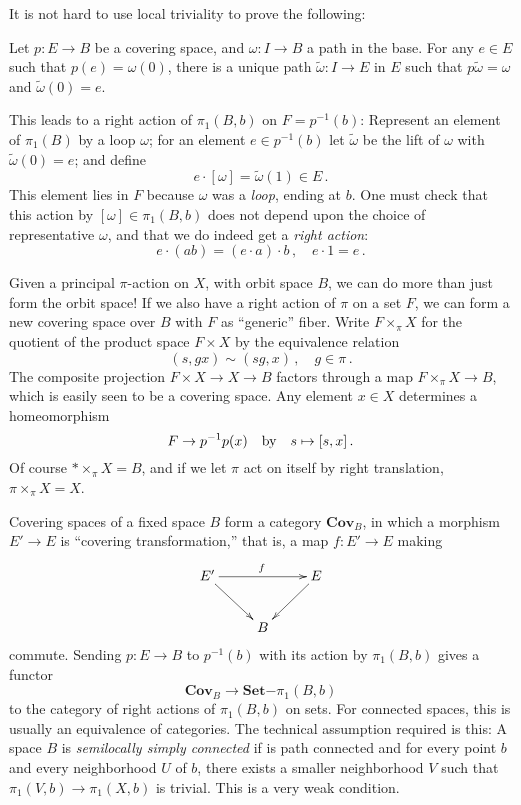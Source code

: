It is not hard to use local triviality to prove the following:
\begin{theorem}
Let $p:E\to B$ be a covering space, and $\omega:I\to B$ a path in the base.
For any $e\in E$ such that $p(e)=\omega(0)$, there is a unique path 
$\widetilde\omega:I\to E$ in $E$ such that $p\widetilde\omega=\omega$ and
$\widetilde\omega(0)=e$. 
\end{theorem}

This leads to a right action of $\pi_1(B,b)$ on $F=p^{-1}(b)$: Represent an 
element of $\pi_1(B)$ by a loop $\omega$; for an element $e\in p^{-1}(b)$
let $\widetilde\omega$ be the lift of $\omega$ with $\widetilde\omega(0)=e$;
and define 
\[
e\cdot[\omega]=\widetilde\omega(1)\in E\,.
\]
This element lies in $F$ because $\omega$ was a {\em loop}, ending at $b$. 
One must check that this action by $[\omega]\in\pi_1(B,b)$ does not depend 
upon the choice of representative $\omega$, and that we do indeed get a 
{\em right action}:
\[
e\cdot(ab)=(e\cdot a)\cdot b\,,\quad e\cdot1=e\,.
\]

Given a principal $\pi$-action on $X$, with orbit space $B$, 
we can do more than just form the orbit space!
If we also have a right action of $\pi$ on a set $F$, we can form a new
covering space over $B$ with $F$ as ``generic'' fiber. 
Write $F\times_\pi X$ for the quotient of the product space $F\times X$ by 
the equivalence relation
\[
(s,gx)\sim(sg,x)\,,\quad g\in\pi\,.
\]
The composite projection $F\times X\to X\to B$ factors through a map
$F\times_\pi X\to B$, which is easily seen to be a covering space. 
Any element $x\in X$ determines a homeomorphism 
\[
F\to p^{-1}p(x)\quad\hbox{by}\quad s\mapsto[s,x]\,.
\]
Of course $\ast\times_\pi X=B$, and if we let $\pi$ act on itself by
right translation, $\pi\times_\pi X=X$. 

Covering spaces of a fixed space $B$ form a category $\mathbf{Cov}_B$,
in which a morphism $E'\to E$ is ``covering transformation,'' that is,
a map $f:E'\to E$ making
\[
\xymatrix{
E' \ar[rr]^f \ar[dr] && E \ar[dl] \\
& B
}\]
commute. 
Sending $p:E\to B$ to $p^{-1}(b)$ with its action by $\pi_1(B,b)$ gives
a functor
\[
\mathbf{Cov}_B\to \mathbf{Set}\mathrm{-}\pi_1(B,b)
\]
to the category of right actions of $\pi_1(B,b)$ on sets. For connected
spaces, this is usually an equivalence of categories. The technical
assumption required is this: A space $B$ is {\em semilocally simply 
connected} if is path connected and for every point $b$ and every 
neighborhood $U$ of $b$, there exists a smaller neighborhood $V$ 
such that $\pi_1(V,b)\to\pi_1(X,b)$ is trivial. This is a very weak
condition.

